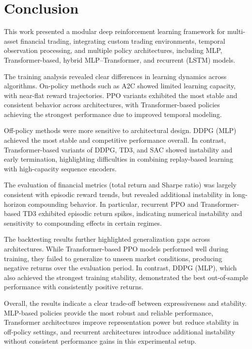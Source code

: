 \section{Conclusion}

This work presented a modular deep reinforcement learning framework 
for multi-asset financial trading, integrating custom trading environments, 
temporal observation processing, and multiple policy architectures, 
including MLP, Transformer-based, hybrid MLP--Transformer, and 
recurrent (LSTM) models.

The training analysis revealed clear differences in learning dynamics across 
algorithms. On-policy methods such as A2C showed limited learning capacity, 
with near-flat reward trajectories. PPO variants exhibited the most stable 
and consistent behavior across architectures, with Transformer-based policies 
achieving the strongest performance due to improved temporal modeling.

Off-policy methods were more sensitive to architectural design. DDPG (MLP) 
achieved the most stable and competitive performance overall. In contrast, 
Transformer-based variants of DDPG, TD3, and SAC showed instability and 
early termination, highlighting difficulties in combining replay-based 
learning with high-capacity sequence encoders.

The evaluation of financial metrics (total return and Sharpe ratio) was 
largely consistent with episodic reward trends, but revealed additional 
instability in long-horizon compounding behavior. In particular, 
recurrent PPO and Transformer-based TD3 exhibited episodic return spikes, 
indicating numerical instability and sensitivity to compounding effects in 
certain regimes.

The backtesting results further highlighted generalization gaps across 
architectures. While Transformer-based PPO models performed well during 
training, they failed to generalize to unseen market conditions, producing 
negative returns over the evaluation period. In contrast, DDPG (MLP), which
also achieved the strongest training stability, demonstrated the best 
out-of-sample performance with consistently positive returns.

Overall, the results indicate a clear trade-off between expressiveness and 
stability. MLP-based policies provide the most robust and reliable performance, 
Transformer architectures improve representation power but reduce stability 
in off-policy settings, and recurrent architectures introduce additional 
instability without consistent performance gains in this experimental setup.
